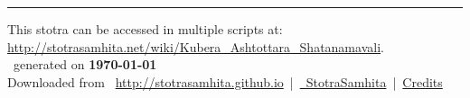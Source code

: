 \documentclass[a5paper,twoside,12pt]{book}
\begin{document}
\setmainfont[Script=Devanagari,Mapping=tex-text]{Sanskrit 2003}
\fontsize {16}{19.25}\selectfont
\let\head\chapt
\begin{center}

\end{center}
\vfill
\centering
\rule{0.8\textwidth}{0.6pt}

\footnotesize
{}\sffamily
This stotra can be accessed in multiple scripts at:\\
\url{http://stotrasamhita.net/wiki/Kubera_Ashtottara_Shatanamavali}.\\[1ex]
\faFilePdfO~generated on \textbf{\today}\\[1ex]
Downloaded from \faGlobe{}~\url{http://stotrasamhita.github.io}~|~\href{https://github.com/StotraSamhita}{\faGithubSquare{}~StotraSamhita}~|~\href{https://stotrasamhita.github.io/about/}{Credits}
\end{document}
